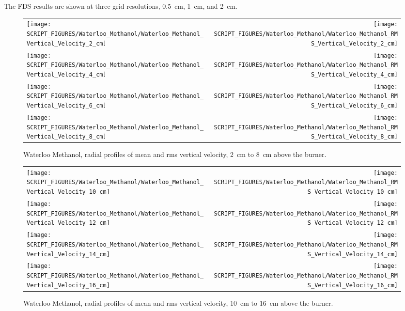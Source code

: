 The FDS results are shown at three grid resolutions, 0.5~cm, 1~cm, and 2~cm.



\begin{figure}[p]
\begin{tabular*}{\textwidth}{l@{\extracolsep{\fill}}r}
\texttt{[image: SCRIPT\_FIGURES/Waterloo\_Methanol/Waterloo\_Methanol\_Vertical\_Velocity\_2\_cm]} &
\texttt{[image: SCRIPT\_FIGURES/Waterloo\_Methanol/Waterloo\_Methanol\_RMS\_Vertical\_Velocity\_2\_cm]} \\
\texttt{[image: SCRIPT\_FIGURES/Waterloo\_Methanol/Waterloo\_Methanol\_Vertical\_Velocity\_4\_cm]} &
\texttt{[image: SCRIPT\_FIGURES/Waterloo\_Methanol/Waterloo\_Methanol\_RMS\_Vertical\_Velocity\_4\_cm]} \\
\texttt{[image: SCRIPT\_FIGURES/Waterloo\_Methanol/Waterloo\_Methanol\_Vertical\_Velocity\_6\_cm]} &
\texttt{[image: SCRIPT\_FIGURES/Waterloo\_Methanol/Waterloo\_Methanol\_RMS\_Vertical\_Velocity\_6\_cm]} \\
\texttt{[image: SCRIPT\_FIGURES/Waterloo\_Methanol/Waterloo\_Methanol\_Vertical\_Velocity\_8\_cm]} &
\texttt{[image: SCRIPT\_FIGURES/Waterloo\_Methanol/Waterloo\_Methanol\_RMS\_Vertical\_Velocity\_8\_cm]}
\end{tabular*}
\caption[Waterloo Methanol, radial mean and rms vertical velocity, 2~cm to 8~cm above burner]
{Waterloo Methanol, radial profiles of mean and rms vertical velocity, 2~cm to 8~cm above the burner.}
\label{Water_Methanol_Vert_Vel_1}
\end{figure}

\begin{figure}[p]
\begin{tabular*}{\textwidth}{l@{\extracolsep{\fill}}r}
\texttt{[image: SCRIPT\_FIGURES/Waterloo\_Methanol/Waterloo\_Methanol\_Vertical\_Velocity\_10\_cm]} &
\texttt{[image: SCRIPT\_FIGURES/Waterloo\_Methanol/Waterloo\_Methanol\_RMS\_Vertical\_Velocity\_10\_cm]} \\
\texttt{[image: SCRIPT\_FIGURES/Waterloo\_Methanol/Waterloo\_Methanol\_Vertical\_Velocity\_12\_cm]} &
\texttt{[image: SCRIPT\_FIGURES/Waterloo\_Methanol/Waterloo\_Methanol\_RMS\_Vertical\_Velocity\_12\_cm]} \\
\texttt{[image: SCRIPT\_FIGURES/Waterloo\_Methanol/Waterloo\_Methanol\_Vertical\_Velocity\_14\_cm]} &
\texttt{[image: SCRIPT\_FIGURES/Waterloo\_Methanol/Waterloo\_Methanol\_RMS\_Vertical\_Velocity\_14\_cm]} \\
\texttt{[image: SCRIPT\_FIGURES/Waterloo\_Methanol/Waterloo\_Methanol\_Vertical\_Velocity\_16\_cm]} &
\texttt{[image: SCRIPT\_FIGURES/Waterloo\_Methanol/Waterloo\_Methanol\_RMS\_Vertical\_Velocity\_16\_cm]}
\end{tabular*}
\caption[Waterloo Methanol, radial mean and rms vertical velocity, 10~cm to 16~cm above burner]
{Waterloo Methanol, radial profiles of mean and rms vertical velocity, 10~cm to 16~cm above the burner.}
\label{Water_Methanol_Vert_Vel_2}
\end{figure}

